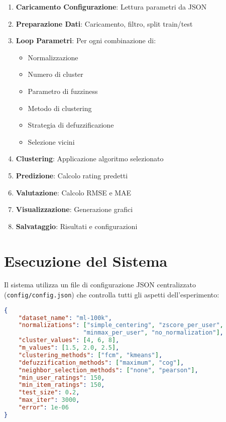 \begin{enumerate}
    \item \textbf{Caricamento Configurazione}: Lettura parametri da JSON
    \item \textbf{Preparazione Dati}: Caricamento, filtro, split train/test
    \item \textbf{Loop Parametri}: Per ogni combinazione di:
        \begin{itemize}
            \item Normalizzazione
            \item Numero di cluster
            \item Parametro di fuzziness
            \item Metodo di clustering
            \item Strategia di defuzzificazione
            \item Selezione vicini
        \end{itemize}
    \item \textbf{Clustering}: Applicazione algoritmo selezionato
    \item \textbf{Predizione}: Calcolo rating predetti
    \item \textbf{Valutazione}: Calcolo RMSE e MAE
    \item \textbf{Visualizzazione}: Generazione grafici
    \item \textbf{Salvataggio}: Risultati e configurazioni
\end{enumerate}

\section{Esecuzione del Sistema}

Il sistema utilizza un file di configurazione JSON centralizzato (\texttt{config/config.json}) che controlla tutti gli aspetti dell'esperimento:

\begin{lstlisting}[language=json, caption=Esempio di configurazione]
{
    "dataset_name": "ml-100k",
    "normalizations": ["simple_centering", "zscore_per_user", 
                      "minmax_per_user", "no_normalization"],
    "cluster_values": [4, 6, 8],
    "m_values": [1.5, 2.0, 2.5],
    "clustering_methods": ["fcm", "kmeans"],
    "defuzzification_methods": ["maximum", "cog"],
    "neighbor_selection_methods": ["none", "pearson"],
    "min_user_ratings": 150,
    "min_item_ratings": 150,
    "test_size": 0.2,
    "max_iter": 3000,
    "error": 1e-06
}
\end{lstlisting}

